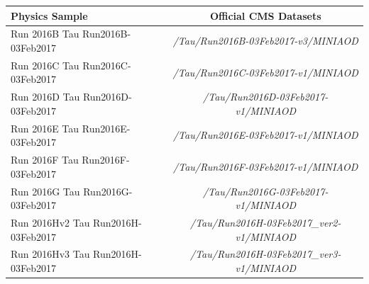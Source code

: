 \begin{table}[h]
  \begin{center}
  \begin{tabular}{| l | c |}
  \hline\hline
        Physics Sample & Official CMS Datasets \\ [0.5ex] \hline \hline
        \footnotesize Run 2016B Tau Run2016B-03Feb2017  & \footnotesize \it /Tau/Run2016B-03Feb2017-v3/MINIAOD \\                                                                                                     
        \footnotesize Run 2016C Tau Run2016C-03Feb2017  & \footnotesize \it /Tau/Run2016C-03Feb2017-v1/MINIAOD \\                                                                                                     
        \footnotesize Run 2016D Tau Run2016D-03Feb2017  & \footnotesize \it /Tau/Run2016D-03Feb2017-v1/MINIAOD \\                                                                                                     
        \footnotesize Run 2016E Tau Run2016E-03Feb2017  & \footnotesize \it /Tau/Run2016E-03Feb2017-v1/MINIAOD \\                                                                                                     
        \footnotesize Run 2016F Tau Run2016F-03Feb2017  & \footnotesize \it /Tau/Run2016F-03Feb2017-v1/MINIAOD \\                                                                                                     
        \footnotesize Run 2016G Tau Run2016G-03Feb2017  & \footnotesize \it /Tau/Run2016G-03Feb2017-v1/MINIAOD \\                                                                                                     
        \footnotesize Run 2016Hv2 Tau Run2016H-03Feb2017& \footnotesize \it /Tau/Run2016H-03Feb2017\_ver2-v1/MINIAOD \\                                                                                               
        \footnotesize Run 2016Hv3 Tau Run2016H-03Feb2017& \footnotesize \it /Tau/Run2016H-03Feb2017\_ver3-v1/MINIAOD \\%
  \hline                                                                                                                                                                                                              
  \hline                                                                                                                                                                                                              

\end{tabular}
\end{center}
\end{table}
